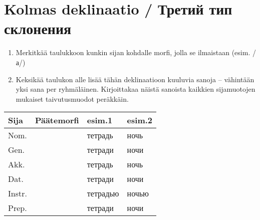 \documentclass[paper=a4, fontsize=11pt]{scrartcl}
\providecommand{\tightlist}{%
  \setlength{\itemsep}{0pt}\setlength{\parskip}{0pt}}
\begin{document}
\clearpage

\section{Kolmas deklinaatio / Третий тип
склонения}\label{kolmas-deklinaatio-ux442ux440ux435ux442ux438ux439-ux442ux438ux43f-ux441ux43aux43bux43eux43dux435ux43dux438ux44f}

\begin{enumerate}
\def\labelenumi{\arabic{enumi}.}
\tightlist
\item
  Merkitkää taulukkoon kunkin sijan kohdalle morfi, jolla se ilmaistaan
  (esim. /а/)
\item
  Keksikää taulukon alle lisää tähän deklinaatioon kuuluvia sanoja --
  vähintään yksi sana per ryhmäläinen. Kirjoittakaa näistä sanoista kaikkien
  sijamuotojen mukaiset taivutusmuodot peräkkäin.
\end{enumerate}

{
\begin{longtable}[c]{@{}llll@{}}
\toprule
Sija & Päätemorfi & esim.1 & esim.2\tabularnewline
\midrule
\endhead
Nom. & & тетрадь & ночь\tabularnewline
Gen. & & тетради & ночи\tabularnewline
Akk. & & тетрадь & ночь\tabularnewline
Dat. & & тетради & ночи\tabularnewline
Instr. & & тетрадью & ночью\tabularnewline
Prep. & & тетради & ночи\tabularnewline
\bottomrule
\end{longtable}
}


\begin{center}

\vspace{1.1cm} 

\underline{\hspace{12cm}} \\
\vspace{0.5cm}
\underline{\hspace{12cm}} \\
\vspace{0.5cm}
\underline{\hspace{12cm}} \\
\vspace{0.5cm}
\underline{\hspace{12cm}} \\
\vspace{0.5cm}
\underline{\hspace{12cm}} \\
\vspace{0.5cm}
\underline{\hspace{12cm}} \\
\vspace{0.5cm}
\underline{\hspace{12cm}} \\
\vspace{0.5cm}
\underline{\hspace{12cm}} \\
\vspace{0.5cm}
\underline{\hspace{12cm}} \\

\end{center}
\clearpage
\end{document}
